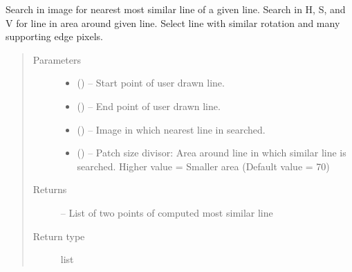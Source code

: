 \documentclass[letterpaper,10pt,english]{sphinxmanual}
\begin{document}

\begin{fulllineitems}
\label{\detokenize{image_lines:image_lines.get_line}}
Search in image for nearest most similar line of a given line.
Search in H, S, and V for line in area around given line. Select line
with similar rotation and many supporting edge pixels.
\begin{quote}\begin{description}
\item[{Parameters}] \leavevmode\begin{itemize}
\item {} 
 () -- Start point of user drawn line.

\item {} 
 () -- End point of user drawn line.

\item {} 
 () -- Image in which nearest line in searched.

\item {} 
 () -- Patch size divisor: Area around line in which similar line is
searched. Higher value = Smaller area (Default value = 70)

\end{itemize}

\item[{Returns}] \leavevmode
\sphinxstylestrong{{[}p1,p2{]}} -- List of two points of computed most similar line

\item[{Return type}] \leavevmode
list

\end{description}\end{quote}

\end{fulllineitems}

\end{document}

